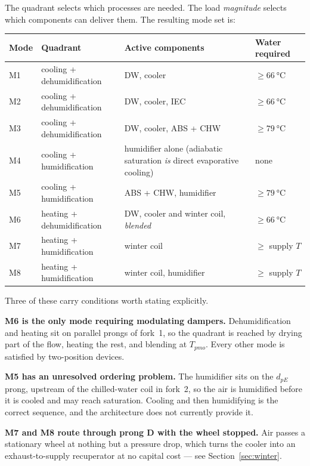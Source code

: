 \documentclass[11pt]{article}
\begin{document}
The quadrant selects which processes are needed. The load \emph{magnitude}
selects which components can deliver them. The resulting mode set is:

\begin{longtable}{@{}llp{}l@{}}
\toprule
\textbf{Mode} & \textbf{Quadrant} & \textbf{Active components} & \textbf{Water required} \\
\midrule
\endhead
M1 & cooling + dehumidification & DW, cooler & $\geq \SI{66}{\degreeCelsius}$ \\
M2 & cooling + dehumidification & DW, cooler, IEC & $\geq \SI{66}{\degreeCelsius}$ \\
M3 & cooling + dehumidification & DW, cooler, ABS + CHW & $\geq \SI{79}{\degreeCelsius}$ \\
M4 & cooling + humidification & humidifier alone (adiabatic saturation \emph{is} direct evaporative cooling) & none \\
M5 & cooling + humidification & ABS + CHW, humidifier & $\geq \SI{79}{\degreeCelsius}$ \\
M6 & heating + dehumidification & DW, cooler and winter coil, \emph{blended} & $\geq \SI{66}{\degreeCelsius}$ \\
M7 & heating + humidification & winter coil & $\geq$ supply $T$ \\
M8 & heating + humidification & winter coil, humidifier & $\geq$ supply $T$ \\
\bottomrule
\end{longtable}

Three of these carry conditions worth stating explicitly.

\textbf{M6 is the only mode requiring modulating dampers.} Dehumidification
and heating sit on parallel prongs of fork~1, so the quadrant is reached by
drying part of the flow, heating the rest, and blending at $T_{pmo}$. Every
other mode is satisfied by two-position devices.

\textbf{M5 has an unresolved ordering problem.} The humidifier sits on the
$d_{pE}$ prong, upstream of the chilled-water coil in fork~2, so the air is
humidified before it is cooled and may reach saturation. Cooling and then
humidifying is the correct sequence, and the architecture does not currently
provide it.

\textbf{M7 and M8 route through prong D with the wheel stopped.} Air passes a
stationary wheel at nothing but a pressure drop, which turns the cooler into an
exhaust-to-supply recuperator at no capital cost --- see
Section~\ref{sec:winter}.
\end{document}
